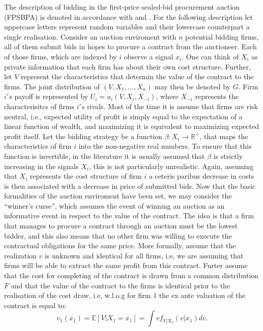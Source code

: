 \documentclass[a4paper,12pt, headsepline]{scrartcl}
\numberwithin{equation}{section}
\begin{document}
The description of bidding in the first-price sealed-bid procurement auction (FPSBPA) is denoted in accordance with \citet{milgrom82} and \citet{HandbookIndustrialOrga}. For the following description let uppercase letters represent random variables and their lowercase counterpart a single realisation. Consider an auction enviroment with $n$ potential bidding firms, all of them submit bids in hopes to procure a contract from the auctioneer. Each of those firms, which are indexed by $i$ observe a signal $x_i$. One can think of $X_i$ as private information that each firm has about their own cost structure. Further, let $V$ represent the characteristics that determin the value of the contract to the firms. The joint distribution of $(V, X_1, ..., X_n)$ may then be denoted by $G$. Firm $i's$ payoff is represented by $U_i = u_i(V, X_i, X_{-i})$, where $X_{-i}$ represents the characterisitcs of firms $i's$ rivals. Most of the time it is assume that firms are risk neutral, i.e., expected utility of profit is simply equal to the expectation of a linear function of wealth, and maximizing it is equivalent to maximizing expected profit itself. Let the bidding strategy be a function $\beta: X_i \rightarrow \mathbb{R}^+$, that maps the characteristics of firm $i$ into the non-negative real numbers. To ensure that this function is invertible, in the literature it is usually assumed that $\beta$ is strictly increasing in the signals $X_i$, this is not particularly unrealistic. Again, assuming that $X_i$ represents the cost structure of firm $i$ a ceteris paribus decrease in costs is then associated with a decrease in price of submitted bids. Now that the basic formalities of the auction enviroment have been set, we may consider the \enquote{winner's curse}, which assumes the event of winning an auction as an informative event in respect to the value of the contract. The idea is that a firm that manages to procure a contract through an auction must be the lowest bidder, and this also means that no other firm was willing to execute the contractual obligations for the same price. More formally, assume that the realization $v$ is unknown and identical for all firms, i.e, we are assuming that firms will be able to extract the same profit from this contract. Furter assume that the cost for completing of the contract is drawn from a common distribution $F$ and that the value of the contract to the firms is identical prior to the realisation of the cost draw, i.e, w.l.o.g for firm 1 the ex ante valuation of the contract is equal to:
\[
v_1(x_1) = \mathbb{E}[V|X_1 = x_1]  = \int vf_{V|X_1}(v|x_1)dv.
\]
\end{document}
